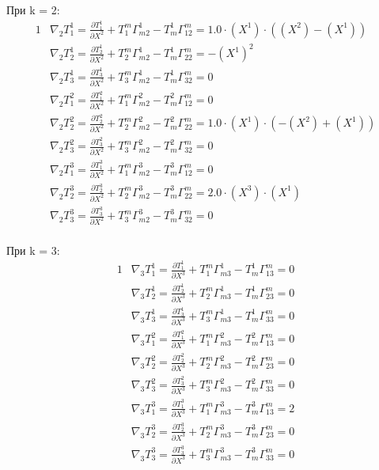 \documentclass{article}
\begin{document}
При k = 2:\\
\begin{alignat*}{1}
  & \nabla_2T^1_1 = \frac{\partial T^1_1}{\partial X^2} + T^m_1\Gamma^1_{m2} - T^1_m\Gamma^m_{12} = 1.0\cdot (X^1)\cdot ((X^2) - (X^1)) \\
  & \nabla_2T^1_2 = \frac{\partial T^1_2}{\partial X^2} + T^m_2\Gamma^1_{m2} - T^1_m\Gamma^m_{22} = -(X^1)^2 \\
  & \nabla_2T^1_3 = \frac{\partial T^1_3}{\partial X^2} + T^m_3\Gamma^1_{m2} - T^1_m\Gamma^m_{32} = 0 \\
  & \nabla_2T^2_1 = \frac{\partial T^2_1}{\partial X^2} + T^m_1\Gamma^2_{m2} - T^2_m\Gamma^m_{12} = 0 \\
  & \nabla_2T^2_2 = \frac{\partial T^2_2}{\partial X^2} + T^m_2\Gamma^2_{m2} - T^2_m\Gamma^m_{22} = 1.0\cdot (X^1)\cdot (-(X^2) + (X^1)) \\
  & \nabla_2T^2_3 = \frac{\partial T^2_3}{\partial X^2} + T^m_3\Gamma^2_{m2} - T^2_m\Gamma^m_{32} = 0 \\
  & \nabla_2T^3_1 = \frac{\partial T^3_1}{\partial X^2} + T^m_1\Gamma^3_{m2} - T^3_m\Gamma^m_{12} = 0 \\
  & \nabla_2T^3_2 = \frac{\partial T^3_2}{\partial X^2} + T^m_2\Gamma^3_{m2} - T^3_m\Gamma^m_{22} = 2.0\cdot (X^3)\cdot (X^1) \\
  & \nabla_2T^3_3 = \frac{\partial T^3_3}{\partial X^2} + T^m_3\Gamma^3_{m2} - T^3_m\Gamma^m_{32} = 0 
\end{alignat*}\\
При k = 3:\\
\begin{alignat*}{1}
  & \nabla_3T^1_1 = \frac{\partial T^1_1}{\partial X^3} + T^m_1\Gamma^1_{m3} - T^1_m\Gamma^m_{13} = 0 \\
  & \nabla_3T^1_2 = \frac{\partial T^1_2}{\partial X^3} + T^m_2\Gamma^1_{m3} - T^1_m\Gamma^m_{23} = 0 \\
  & \nabla_3T^1_3 = \frac{\partial T^1_3}{\partial X^3} + T^m_3\Gamma^1_{m3} - T^1_m\Gamma^m_{33} = 0 \\
  & \nabla_3T^2_1 = \frac{\partial T^2_1}{\partial X^3} + T^m_1\Gamma^2_{m3} - T^2_m\Gamma^m_{13} = 0 \\
  & \nabla_3T^2_2 = \frac{\partial T^2_2}{\partial X^3} + T^m_2\Gamma^2_{m3} - T^2_m\Gamma^m_{23} = 0 \\
  & \nabla_3T^2_3 = \frac{\partial T^2_3}{\partial X^3} + T^m_3\Gamma^2_{m3} - T^2_m\Gamma^m_{33} = 0 \\
  & \nabla_3T^3_1 = \frac{\partial T^3_1}{\partial X^3} + T^m_1\Gamma^3_{m3} - T^3_m\Gamma^m_{13} = 2 \\
  & \nabla_3T^3_2 = \frac{\partial T^3_2}{\partial X^3} + T^m_2\Gamma^3_{m3} - T^3_m\Gamma^m_{23} = 0 \\
  & \nabla_3T^3_3 = \frac{\partial T^3_3}{\partial X^3} + T^m_3\Gamma^3_{m3} - T^3_m\Gamma^m_{33} = 0 
\end{alignat*}\\
\end{document}
